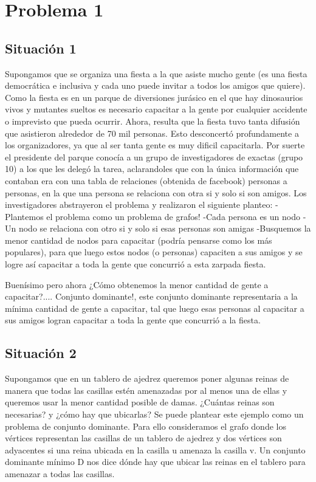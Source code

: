 \section{Problema 1}

\subsection{Situación 1}
Supongamos que se organiza una fiesta a la que asiste mucho gente (es una fiesta democrática e inclusiva y cada uno puede invitar a todos los amigos que quiere). Como la fiesta es en un parque de diversiones jurásico en el que hay dinosaurios vivos y mutantes sueltos es necesario capacitar a la gente por cualquier accidente o imprevisto que pueda ocurrir. Ahora, resulta que la fiesta tuvo tanta difusión que asistieron alrededor de 70 mil personas. Esto desconcertó profundamente a los organizadores, ya que al ser tanta gente es muy dificil capacitarla. Por suerte el presidente del parque conocía a un grupo de investigadores de exactas (grupo 10) a los que les delegó la tarea, aclarandoles que con la única información que contaban era con una tabla de relaciones (obtenida de facebook) personas a personas, en la que una persona se relaciona con otra si y solo si son amigos.
Los investigadores abstrayeron el problema y realizaron el siguiente planteo:
-Plantemos el problema como un problema de grafos!
-Cada persona es un nodo
-Un nodo se relaciona con otro si y solo si esas personas son amigas
-Busquemos la menor cantidad de nodos para capacitar (podría pensarse como los más populares), para que luego estos nodos (o personas) capaciten a sus amigos y se logre así capacitar a toda la gente que concurrió a esta zarpada fiesta.

Buenísimo pero ahora ¿Cómo obtenemos la menor cantidad de gente a capacitar?.... Conjunto dominante!, este conjunto dominante representaria a la mínima cantidad de gente a capacitar, tal que luego esas personas al capacitar a sus amigos logran capacitar a toda la gente que concurrió a la fiesta.

\subsection{Situación 2}
Supongamos que en un tablero de ajedrez queremos poner algunas reinas de manera que todas las casillas estén amenazadas por al menos una de ellas y queremos usar la menor cantidad posible de damas. ¿Cuántas reinas son necesarias? y ¿cómo hay que ubicarlas? Se puede plantear este ejemplo como un problema de conjunto dominante. Para ello
consideramos el grafo donde los vértices representan las casillas de un tablero de ajedrez y dos vértices son adyacentes si una reina ubicada en la casilla u amenaza la casilla v. Un conjunto dominante mínimo D nos dice dónde hay que ubicar las reinas en el tablero para amenazar a todas las casillas. 

